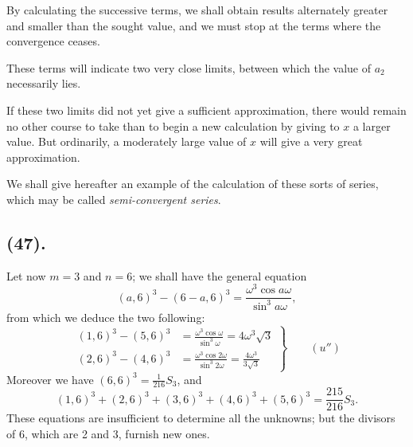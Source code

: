 \documentclass{article}
\begin{document}
By calculating the successive terms, we shall obtain results alternately greater and smaller than the sought value, and we must stop at the terms where the convergence ceases.

These terms will indicate two very close limits, between which the value of $a_{2}$ necessarily lies.

If these two limits did not yet give a sufficient approximation, there would remain no other course to take than to begin a new calculation by giving to $x$ a larger value. But ordinarily, a moderately large value of $x$ will give a very great approximation.

We shall give hereafter an example of the calculation of these sorts of series, which may be called \emph{semi-convergent series}.


\subsection*{(47).}

Let now $m=3$ and $n=6$; we shall have the general equation
\[ (a,6)^{3}-(6-a,6)^{3}=\frac{\omega^{3}\cos a\omega}{\sin^{3}a\omega}, \]
from which we deduce the two following:
\[ \left.\begin{aligned} (1,6)^{3}-(5,6)^{3}&=\frac{\omega^{3}\cos\omega}{\sin^{3}\omega}=4\omega^{3}\sqrt{3}\\ (2,6)^{3}-(4,6)^{3}&=\frac{\omega^{3}\cos 2\omega}{\sin^{3}2\omega}=\frac{4\omega^{3}}{3\sqrt{3}} \end{aligned}\right\}\qquad(u'') \]
Moreover we have $(6,6)^{3}=\frac{1}{216}S_{3}$, and
\[ (1,6)^{3}+(2,6)^{3}+(3,6)^{3}+(4,6)^{3}+(5,6)^{3}=\frac{215}{216}S_{3}. \]
These equations are insufficient to determine all the unknowns; but the divisors of 6, which are 2 and 3, furnish new ones.
\end{document}
